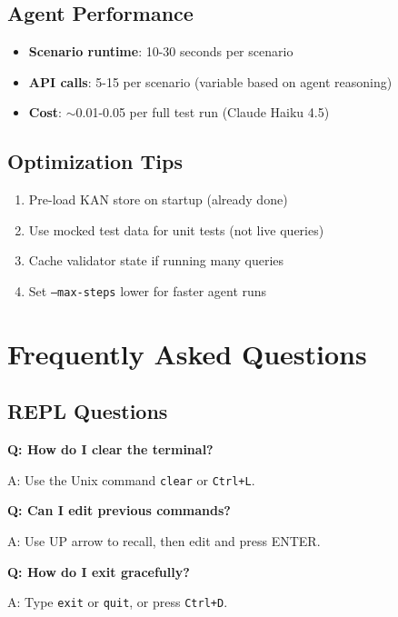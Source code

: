 \documentclass[12pt,oneside,openany]{book}
\begin{document}
\section{Agent Performance}

\begin{itemize}
    \item \textbf{Scenario runtime}: 10-30 seconds per scenario
    \item \textbf{API calls}: 5-15 per scenario (variable based on agent reasoning)
    \item \textbf{Cost}: $\sim$0.01-0.05 per full test run (Claude Haiku 4.5)
\end{itemize}

\section{Optimization Tips}

\begin{enumerate}
    \item Pre-load KAN store on startup (already done)
    \item Use mocked test data for unit tests (not live queries)
    \item Cache validator state if running many queries
    \item Set \texttt{--max-steps} lower for faster agent runs
\end{enumerate}

\chapter{Frequently Asked Questions}

\section{REPL Questions}

\textbf{Q: How do I clear the terminal?}

A: Use the Unix command \texttt{clear} or \texttt{Ctrl+L}.

\textbf{Q: Can I edit previous commands?}

A: Use UP arrow to recall, then edit and press ENTER.

\textbf{Q: How do I exit gracefully?}

A: Type \texttt{exit} or \texttt{quit}, or press \texttt{Ctrl+D}.
\end{document}
